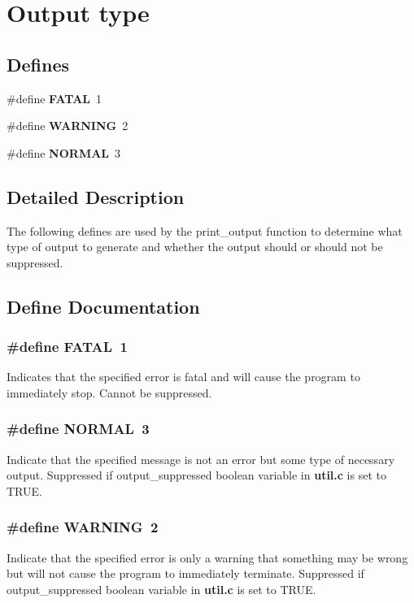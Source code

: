 \section{Output type}
\label{group__output__type}
\subsection*{Defines}
\begin{CompactItemize}
\item 
\#define {\bf FATAL}\ 1
\item 
\#define {\bf WARNING}\ 2
\item 
\#define {\bf NORMAL}\ 3
\end{CompactItemize}


\subsection{Detailed Description}
The following defines are used by the print\_\-output function to determine what type of output to generate and whether the output should or should not be suppressed. 

\subsection{Define Documentation}
\subsubsection{\setlength{\rightskip}{0pt plus 5cm}\#define FATAL\ 1}\label{group__output__type_a0}


Indicates that the specified error is fatal and will cause the program to immediately stop. Cannot be suppressed. 
\subsubsection{\setlength{\rightskip}{0pt plus 5cm}\#define NORMAL\ 3}\label{group__output__type_a2}


Indicate that the specified message is not an error but some type of necessary output. Suppressed if output\_\-suppressed boolean variable in {\bf util.c} is set to TRUE. 
\subsubsection{\setlength{\rightskip}{0pt plus 5cm}\#define WARNING\ 2}\label{group__output__type_a1}


Indicate that the specified error is only a warning that something may be wrong but will not cause the program to immediately terminate. Suppressed if output\_\-suppressed boolean variable in {\bf util.c} is set to TRUE. 